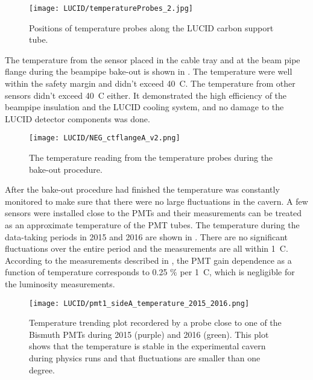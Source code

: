 \begin{figure}
\centering
\texttt{[image: LUCID/temperatureProbes\_2.jpg]}
\caption{Positions of temperature probes along the LUCID carbon support tube.}
\label{fig:temperatureProbes_VJCone}
\end{figure}

The temperature from the sensor placed in the cable tray and at the beam pipe flange during the beampipe bake-out is shown in .
The temperature were well within the safety margin and didn't exceed 40\degree~C. The temperature from other sensors didn't exceed 40\degree~C either.
It demonstrated the high efficiency of the beampipe insulation and the LUCID cooling system, and no damage to the LUCID detector components was done.

\begin{figure}
\centering
\texttt{[image: LUCID/NEG\_ctflangeA\_v2.png]}
\caption{The temperature reading from the temperature probes during the bake-out procedure.}
\label{fig:NEG_ctflangeA}
\end{figure}
 
After the bake-out procedure had finished the temperature was constantly monitored to make sure that there were no large fluctuations in the cavern.
A few sensors were installed close to the PMTs and their measurements can be treated as an approximate temperature of the PMT tubes.
The temperature during the data-taking periods in 2015 and 2016 are shown in . 
There are no significant fluctuations over the entire period and the measurements are all within 1\degree~C.
According to the measurements described in , the PMT gain dependence as a function of temperature corresponds
to 0.25 $\%$ per 1\degree~C, which is negligible for the luminosity measurements.

\begin{figure}
\centering
\texttt{[image: LUCID/pmt1\_sideA\_temperature\_2015\_2016.png]}
\caption{Temperature trending plot recordered by a probe close to one of the Bismuth PMTs
during 2015 (purple) and 2016 (green). This plot shows that the temperature is stable in 
the experimental cavern during physics runs and that fluctuations are smaller than one degree.}
\label{fig:tempTrendingPlot}
\end{figure}

